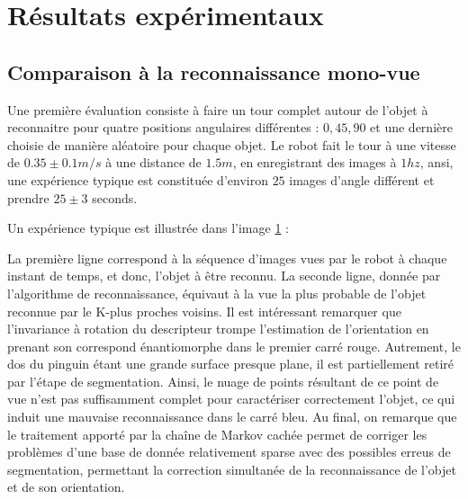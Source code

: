\section{Résultats expérimentaux}
\subsection{Comparaison à la reconnaissance mono-vue}
Une première évaluation consiste à faire un tour complet autour de l'objet à reconnaitre pour quatre positions angulaires différentes : $0, 45, 90$ et une dernière choisie de manière aléatoire pour chaque objet. Le robot fait le tour à une vitesse de $0.35 \pm 0.1 m/s$ à une distance de $1.5m$, en enregistrant des images à $1hz$, ansi, une expérience typique est constituée d'environ $25$  images d'angle différent et prendre $25 \pm 3$ seconds. 

Un expérience typique est illustrée dans l'image \ref{fig:resultats_expe} :

\begin{figure}[H]
			\caption{}
	\label{fig:resultats_expe}
\end{figure}

La première ligne correspond à la séquence d'images vues par le robot à chaque instant de temps, et donc, l'objet à être reconnu. La seconde ligne, donnée par l'algorithme de reconnaissance, équivaut à la vue la plus probable de l'objet reconnue par le K-plus proches voisins. Il est intéressant remarquer que l'invariance à rotation du descripteur trompe l'estimation de l'orientation en prenant son correspond énantiomorphe dans le premier carré rouge. Autrement, le dos du pinguin étant une grande surface presque plane, il est partiellement retiré par l'étape de segmentation. Ainsi, le nuage de points résultant de ce point de vue n'est pas suffisamment complet pour caractériser correctement l'objet, ce qui induit une mauvaise reconnaissance dans le carré bleu. Au final, on remarque que le traitement apporté par la chaîne de Markov cachée permet de corriger les problèmes d'une base de donnée relativement sparse avec des possibles erreus de segmentation, permettant la correction simultanée de la reconnaissance de l'objet et de son orientation. 

